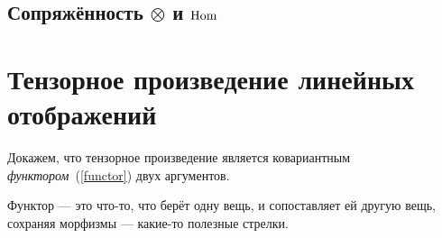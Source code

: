 \subsection{Сопряжённость $\otimes$ и $\operatorname{Hom}$}


\section{Тензорное произведение линейных отображений}
Докажем, что тензорное произведение является ковариантным \textit{функтором}~(\ref{functor}) двух аргументов.

Функтор --- это что-то, что берёт одну вещь, и сопоставляет ей другую вещь, сохраняя морфизмы --- какие-то полезные стрелки.



